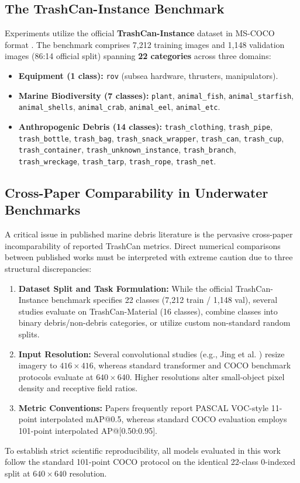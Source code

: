 \documentclass[conference]{IEEEtran}
\begin{document}
\subsection{The TrashCan-Instance Benchmark}
Experiments utilize the official \textbf{TrashCan-Instance} dataset \cite{trashcan} in MS-COCO format \cite{coco}. The benchmark comprises 7,212 training images and 1,148 validation images (86:14 official split) spanning \textbf{22 categories} across three domains:
\begin{itemize}
    \item \textbf{Equipment (1 class):} \texttt{rov} (subsea hardware, thrusters, manipulators).
    \item \textbf{Marine Biodiversity (7 classes):} \texttt{plant}, \texttt{animal\_fish}, \texttt{animal\_starfish}, \texttt{animal\_shells}, \texttt{animal\_crab}, \texttt{animal\_eel}, \texttt{animal\_etc}.
    \item \textbf{Anthropogenic Debris (14 classes):} \texttt{trash\_clothing}, \texttt{trash\_pipe}, \texttt{trash\_bottle}, \texttt{trash\_bag}, \texttt{trash\_snack\_wrapper}, \texttt{trash\_can}, \texttt{trash\_cup}, \texttt{trash\_container}, \texttt{trash\_unknown\_instance}, \texttt{trash\_branch}, \texttt{trash\_wreckage}, \texttt{trash\_tarp}, \texttt{trash\_rope}, \texttt{trash\_net}.
\end{itemize}

\subsection{Cross-Paper Comparability in Underwater Benchmarks}
\label{sec:comparability}
A critical issue in published marine debris literature is the pervasive cross-paper incomparability of reported TrashCan metrics. Direct numerical comparisons between published works must be interpreted with extreme caution due to three structural discrepancies:
\begin{enumerate}
    \item \textbf{Dataset Split and Task Formulation:} While the official TrashCan-Instance benchmark specifies 22 classes (7,212 train / 1,148 val), several studies evaluate on TrashCan-Material (16 classes), combine classes into binary debris/non-debris categories, or utilize custom non-standard random splits.
    \item \textbf{Input Resolution:} Several convolutional studies (e.g., Jing et al. \cite{yolo11_base}) resize imagery to $416 \times 416$, whereas standard transformer and COCO benchmark protocols evaluate at $640 \times 640$. Higher resolutions alter small-object pixel density and receptive field ratios.
    \item \textbf{Metric Conventions:} Papers frequently report PASCAL VOC-style 11-point interpolated mAP@0.5, whereas standard COCO evaluation employs 101-point interpolated AP@[0.50:0.95]. 
\end{enumerate}
To establish strict scientific reproducibility, all models evaluated in this work follow the standard 101-point COCO protocol on the identical 22-class 0-indexed split at $640 \times 640$ resolution.
\end{document}
